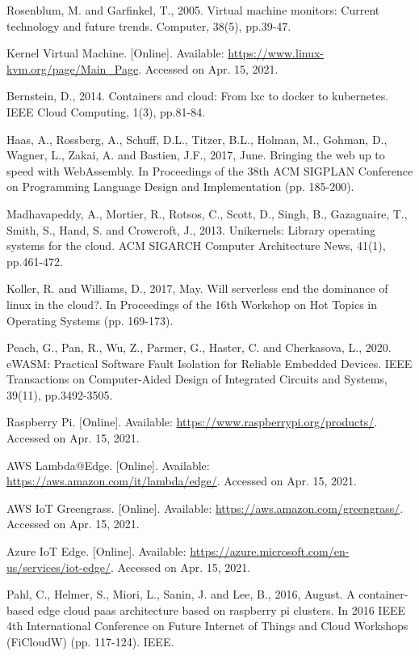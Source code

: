 \documentclass{ieeeaccess}
\begin{document}
\begin{thebibliography}{00}
 Rosenblum, M. and Garfinkel, T., 2005. Virtual machine monitors: Current technology and future trends. Computer, 38(5), pp.39-47.

 Kernel Virtual Machine. [Online]. Available: \url{https://www.linux-kvm.org/page/Main_Page}. Accessed on Apr. 15, 2021.

 Bernstein, D., 2014. Containers and cloud: From lxc to docker to kubernetes. IEEE Cloud Computing, 1(3), pp.81-84.

 Haas, A., Rossberg, A., Schuff, D.L., Titzer, B.L., Holman, M., Gohman, D., Wagner, L., Zakai, A. and Bastien, J.F., 2017, June. Bringing the web up to speed with WebAssembly. In Proceedings of the 38th ACM SIGPLAN Conference on Programming Language Design and Implementation (pp. 185-200).

 Madhavapeddy, A., Mortier, R., Rotsos, C., Scott, D., Singh, B., Gazagnaire, T., Smith, S., Hand, S. and Crowcroft, J., 2013. Unikernels: Library operating systems for the cloud. ACM SIGARCH Computer Architecture News, 41(1), pp.461-472.

 Koller, R. and Williams, D., 2017, May. Will serverless end the dominance of linux in the cloud?. In Proceedings of the 16th Workshop on Hot Topics in Operating Systems (pp. 169-173).

 Peach, G., Pan, R., Wu, Z., Parmer, G., Haster, C. and Cherkasova, L., 2020. eWASM: Practical Software Fault Isolation for Reliable Embedded Devices. IEEE Transactions on Computer-Aided Design of Integrated Circuits and Systems, 39(11), pp.3492-3505.

 Raspberry Pi. [Online]. Available: \url{https://www.raspberrypi.org/products/}. Accessed on Apr. 15, 2021.

 AWS Lambda@Edge. [Online]. Available: \url{https://aws.amazon.com/it/lambda/edge/}. Accessed on Apr. 15, 2021.

 AWS IoT Greengrass. [Online]. Available: \url{https://aws.amazon.com/greengrass/}. Accessed on Apr. 15, 2021.

 Azure IoT Edge. [Online]. Available: \url{https://azure.microsoft.com/en-us/services/iot-edge/}. Accessed on Apr. 15, 2021.

 Pahl, C., Helmer, S., Miori, L., Sanin, J. and Lee, B., 2016, August. A container-based edge cloud paas architecture based on raspberry pi clusters. In 2016 IEEE 4th International Conference on Future Internet of Things and Cloud Workshops (FiCloudW) (pp. 117-124). IEEE.


\end{thebibliography}
\end{document}
